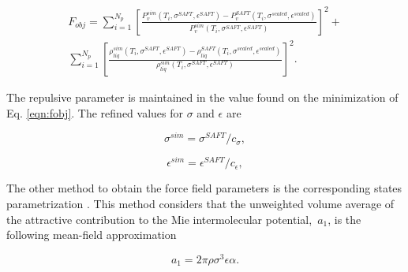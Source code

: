 \documentclass[
	12pt,				%
	openany,			%
	oneside,			%
	a4paper,			%
	english,			%
	brazil				%
	]{abntex2}
\providecommand{\DIFaddbegin}{}
\providecommand{\DIFaddend}{}
\providecommand{\DIFdelbegin}{}
\providecommand{\DIFdelend}{}
\providecommand{\DIFaddbegin}{} %
\providecommand{\DIFaddend}{} %
\providecommand{\DIFdelbegin}{} %
\providecommand{\DIFdelend}{} %
\begin{document}
\begin{equation}
\DIFdelbegin %
\DIFdelend \DIFaddbegin \begin{split}
F_{obj}= \sum_{i=1}^{N_{p}} \left[\frac{P_{v}^{sim}(T_{i},\sigma^{SAFT},\epsilon^{SAFT})-P_{v}^{SAFT}(T_{i},\sigma^{scaled},\epsilon^{scaled})}{P_{v}^{sim}(T_{i},\sigma^{SAFT},\epsilon^{SAFT})} \right]^2 + \\
\sum_{i=1}^{N_{p}} \left[\frac{\rho_{liq}^{sim}(T_{i},\sigma^{SAFT},\epsilon^{SAFT})-\rho_{liq}^{SAFT}(T_{i},\sigma^{scaled},\epsilon^{scaled})}{\rho_{liq}^{sim}(T_{i},\sigma^{SAFT},\epsilon^{SAFT})} \right]^2 .
\end{split}
\DIFaddend \label{eqn:fobjla}
\end{equation}

The repulsive parameter is maintained in the value found on the minimization of Eq. \eqref{eqn:fobj}. The refined values for $\sigma$ and $\epsilon$ are

\begin{equation}
\sigma^{sim} = \sigma^{SAFT}/c_{\sigma},
\label{eqn:simsigma}
\end{equation}

\begin{equation}
\epsilon^{sim} = \epsilon^{SAFT}/c_{\epsilon},
\label{eqn:simeps}
\end{equation}

The other method to obtain the force field parameters is the corresponding states parametrization \cite{mejia2014}. This method considers that the unweighted volume average of the attractive contribution to the Mie intermolecular potential, $ \, a_{1}$, is the following mean-field approximation

\begin{equation}
a_{1} = 2\pi\rho\sigma^{3}\epsilon\alpha .
\label{eqn:a1corres}
\end{equation}
\end{document}
